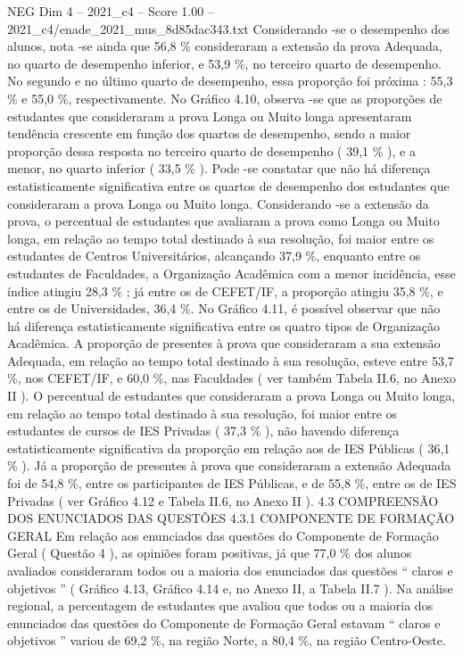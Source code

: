 \begin{textsample}{NEG Dim 4 – 2021\_c4 – Score 1.00 – 2021\_c4/enade\_2021\_mus\_8d85dac343.txt}
Considerando -se o desempenho dos alunos, nota -se ainda que 56,8 \% consideraram a extensão da prova Adequada, no quarto de desempenho inferior, e 53,9 \%, no terceiro quarto de desempenho.
No segundo e no último quarto de desempenho, essa proporção foi próxima : 55,3 \% e 55,0 \%, respectivamente.
No Gráfico 4.10, observa -se que as proporções de estudantes que consideraram a prova Longa ou Muito longa apresentaram tendência crescente em função dos quartos de desempenho, sendo a maior proporção dessa resposta no terceiro quarto de desempenho ( 39,1 \% ), e a menor, no quarto inferior ( 33,5 \% ).
Pode -se constatar que não há diferença estatisticamente significativa entre os quartos de desempenho dos estudantes que consideraram a prova Longa ou Muito longa.
Considerando -se a extensão da prova, o percentual de estudantes que avaliaram a prova como Longa ou Muito longa, em relação ao tempo total destinado à sua resolução, foi maior entre os estudantes de Centros Universitários, alcançando 37,9 \%, enquanto entre os estudantes de Faculdades, a Organização Acadêmica com a menor incidência, esse índice atingiu 28,3 \% ; já entre os de CEFET/IF, a proporção atingiu 35,8 \%, e entre os de Universidades, 36,4 \%.
No Gráfico 4.11, é possível observar que não há diferença estatisticamente significativa entre os quatro tipos de Organização Acadêmica.
A proporção de presentes à prova que consideraram a sua extensão Adequada, em relação ao tempo total destinado à sua resolução, esteve entre 53,7 \%, nos CEFET/IF, e 60,0 \%, nas Faculdades ( ver também Tabela II.6, no Anexo II ).
O percentual de estudantes que consideraram a prova Longa ou Muito longa, em relação ao tempo total destinado à sua resolução, foi maior entre os estudantes de cursos de IES Privadas ( 37,3 \% ), não havendo diferença estatisticamente significativa da proporção em relação aos de IES Públicas ( 36,1 \% ).
Já a proporção de presentes à prova que consideraram a extensão Adequada foi de 54,8 \%, entre os participantes de IES Públicas, e de 55,8 \%, entre os de IES Privadas ( ver Gráfico 4.12 e Tabela II.6, no Anexo II ). 4.3 COMPREENSÃO DOS ENUNCIADOS DAS QUESTÕES 4.3.1 COMPONENTE DE FORMAÇÃO GERAL Em relação aos enunciados das questões do Componente de Formação Geral ( Questão 4 ), as opiniões foram positivas, já que 77,0 \% dos alunos avaliados consideraram todos ou a maioria dos enunciados das questões “ claros e objetivos ” ( Gráfico 4.13, Gráfico 4.14 e, no Anexo II, a Tabela II.7 ).
Na análise regional, a percentagem de estudantes que avaliou que todos ou a maioria dos enunciados das questões do Componente de Formação Geral estavam “ claros e objetivos ” variou de 69,2 \%, na região Norte, a 80,4 \%, na região Centro-Oeste.

\end{textsample}
